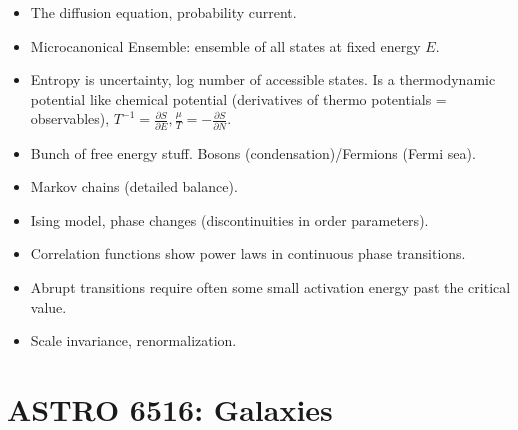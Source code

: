 \documentclass[11pt,
        usenames, %
        dvipsnames %
    ]{article}
\newcommand*{\pd}[2]{\frac{\partial#1}{\partial#2}}
\begin{document}
\begin{itemize}
    \item The diffusion equation, probability current.

    \item Microcanonical Ensemble: ensemble of all states at fixed energy $E$.

    \item Entropy is uncertainty, log number of accessible states. Is a
        thermodynamic potential like chemical potential (derivatives of thermo
        potentials = observables), $T^{-1} = \pd{S}{E}, \frac{\mu}{T} =
        -\pd{S}{N}$.

    \item Bunch of free energy stuff. Bosons (condensation)/Fermions (Fermi
        sea).

    \item Markov chains (detailed balance).

    \item Ising model, phase changes (discontinuities in order parameters).

    \item Correlation functions show power laws in continuous phase transitions.

    \item Abrupt transitions require often some small activation energy past the
        critical value.

    \item Scale invariance, renormalization.
\end{itemize}

\section{ASTRO 6516: Galaxies}
\end{document}

